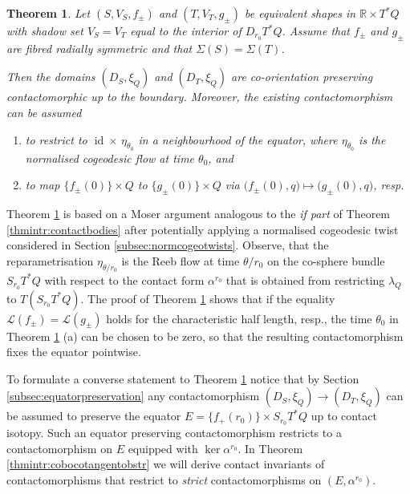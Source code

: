 \documentclass{amsart}
\newtheorem{thmintr}{Theorem}
\theoremstyle{definition}
\newcommand{\LLL}{\mathscr L}
\newcommand{\R}{\mathbb R}
\newcommand{\ra}{\rightarrow}
\DeclareMathOperator{\id}{\mathrm{id}}
\begin{document}
\begin{thmintr}
\label{thmintr:cobocotangentconstr}
Let $(S,V_S,f_{\pm})$ and $(T,V_T,g_{\pm})$
be equivalent shapes in $\R\times T^*Q$
with shadow set $V_S=V_T$
equal to the interior of $D_{r_0}T^*Q$.
Assume that $f_{\pm}$ and $g_{\pm}$ are
fibred radially symmetric and that
$\Sigma(S)=\Sigma(T)$.

Then the domains $(D_S,\xi_Q)$ and $(D_T,\xi_Q)$
are co-orientation preserving contactomorphic
up to the boundary.
Moreover, the existing contactomorphism
can be assumed
  	\begin{enumerate}
 	\item[(a)]
	to restrict to $\id\times\,\eta_{\theta_0}$
	in a neighbourhood of the equator,
	where $\eta_{\theta_0}$ is
	the normalised cogeodesic flow
	at time $\theta_0$, and
 	\item[(b)]
	to map $\{f_{\pm}(0)\}\times Q$
	to $\{g_{\pm}(0)\}\times Q$ via
	$\big(f_{\pm}(0),q\big)\mapsto
	\big(g_{\pm}(0),q\big)$, resp.
  	\end{enumerate}
\end{thmintr}


Theorem \ref{thmintr:cobocotangentconstr}
is based on a Moser argument analogous to
the {\it if part} of
Theorem \ref{thmintr:contactbodies}
after potentially applying
a normalised cogeodesic twist
considered in Section \ref{subsec:normcogeotwists}.
Observe, that the reparametrisation $\eta_{\theta/r_0}$
is the Reeb flow at time $\theta/r_0$
on the co-sphere bundle $S_{r_0}T^*Q$
with respect to the contact form $\alpha^{r_0}$
that is obtained from restricting $\lambda_Q$
to $T(S_{r_0}T^*Q)$.
The proof of
Theorem \ref{thmintr:cobocotangentconstr}
shows that if the equality
$\LLL(f_{\pm})=\LLL(g_{\pm})$
holds for the characteristic half length, resp.,
the time $\theta_0$
in Theorem \ref{thmintr:cobocotangentconstr} (a)
can be chosen to be zero,
so that the resulting contactomorphism 
fixes the equator pointwise.

To formulate a converse statement
to Theorem \ref{thmintr:cobocotangentconstr}
notice that by Section \ref{subsec:equatorpreservation}
any contactomorphism $(D_S,\xi_Q)\ra(D_T,\xi_Q)$
can be assumed to preserve the equator
$E=\{f_+(r_0)\}\times S_{r_0}T^*Q$
up to contact isotopy.
Such an equator preserving contactomorphism
restricts to a contactomorphism on $E$
equipped with $\ker\alpha^{r_0}$.
In Theorem \ref{thmintr:cobocotangentobstr}
we will derive contact invariants of contactomorphisms
that restrict to {\it strict} contactomorphisms on $(E,\alpha^{r_0})$.
\end{document}
